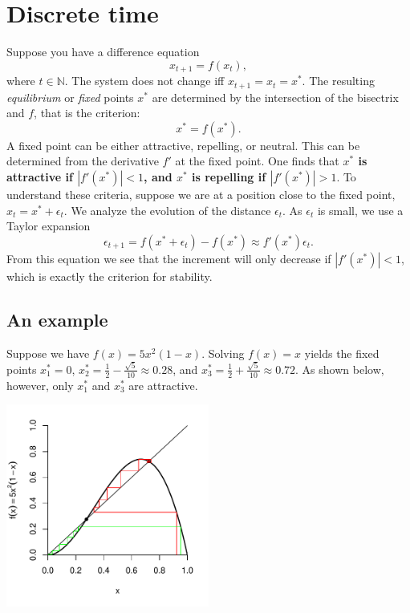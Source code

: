 \documentclass[a4paper]{article}\usepackage[]{graphicx}\usepackage[]{color}
\begin{document}
\section{Discrete time}
  Suppose you have a difference equation
	\begin{equation}
		\label{eq:discrete}
		x_{t+1} = f(x_t),
	\end{equation}
	where $t\in \mathbb{N}$. The system does not change iff $x_{t+1} = x_t = x^*$. The resulting \emph{equilibrium} or \emph{fixed} points $x^*$ are determined by the intersection of the bisectrix and $f$, that is the criterion:
	\begin{equation}
		\label{eq:5}
		x^*=f(x^*).
	\end{equation}
	A fixed point can be either attractive, repelling, or neutral. This can be determined from the derivative $f'$ at the fixed point. One finds that {\bf $x^*$ is attractive if $|f'(x^*)| < 1$, and $x^*$ is repelling if $|f'(x^*)|>1$}. To understand these criteria, suppose we are at a position close to the fixed point, $x_t = x^* + \epsilon_t$. We analyze the evolution of the distance $\epsilon_t$. As $\epsilon_t$ is small, we use a Taylor expansion
	\begin{equation}
		\label{eq:4}
		\epsilon_{t+1} = f(x^*+\epsilon_t) - f(x^*) \approx f'(x^*) \epsilon_t.
	\end{equation}
	From this equation we see that the increment will only decrease if $|f'(x^*)|<1$, which is exactly the criterion for stability.
	
	\subsection{An example}
	Suppose we have $f(x) = 5x^2(1-x)$. Solving $f(x) = x$ yields the fixed points $x_1^*=0$, $x_2^* = \frac{1}{2} - \frac{\sqrt{5}}{10} \approx 0.28$, and $x^*_3 = \frac{1}{2} + \frac{\sqrt{5}}{10} \approx 0.72$. As shown below, however, only $x^*_1$ and $x^*_3$ are attractive.
	\begin{center}
		\includegraphics[width=6.66cm]{tutorial-p2.pdf}
	\end{center}
\end{document}
